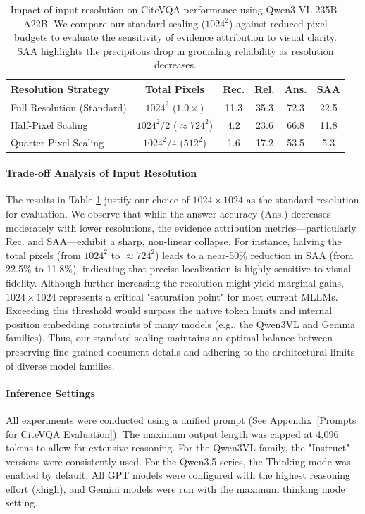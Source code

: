 \documentclass[]{opendatalab}
\begin{document}
{{{\begin{table}[htbp]
\centering
\small
\caption{Impact of input resolution on CiteVQA performance using Qwen3-VL-235B-A22B. We compare our standard scaling ($1024^2$) against reduced pixel budgets to evaluate the sensitivity of evidence attribution to visual clarity. SAA highlights the precipitous drop in grounding reliability as resolution decreases.}
\label{tab:resolution_impact}
\begin{tabular}{@{}l c cccc@{}}
\toprule
\textbf{Resolution Strategy} & \textbf{Total Pixels} & \textbf{Rec.} & \textbf{Rel.} & \textbf{Ans.} & \textbf{SAA} \\ \midrule
Full Resolution (Standard) & $1024^2$ ($1.0\times$) &11.3&35.3&72.3&22.5 \\
Half-Pixel Scaling & $1024^2 / 2$ ($\approx 724^2$) &4.2&23.6&66.8&11.8 \\
Quarter-Pixel Scaling & $1024^2 / 4$ ($512^2$) &1.6&17.2&53.5&5.3 \\ \bottomrule
\end{tabular}
\end{table}

\paragraph{Trade-off Analysis of Input Resolution}
The results in Table \ref{tab:resolution_impact} justify our choice of $1024 \times 1024$ as the standard resolution for evaluation. We observe that while the answer accuracy (Ans.) decreases moderately with lower resolutions, the evidence attribution metrics---particularly Rec. and SAA---exhibit a sharp, non-linear collapse. For instance, halving the total pixels (from $1024^2$ to $\approx 724^2$) leads to a near-50\% reduction in SAA (from 22.5\% to 11.8\%), indicating that precise localization is highly sensitive to visual fidelity. Although further increasing the resolution might yield marginal gains, $1024 \times 1024$ represents a critical "saturation point" for most current MLLMs. Exceeding this threshold would surpass the native token limits and internal position embedding constraints of many models (e.g., the Qwen3VL and Gemma families). Thus, our standard scaling maintains an optimal balance between preserving fine-grained document details and adhering to the architectural limits of diverse model families.

\paragraph{Inference Settings} All experiments were conducted using a unified prompt (See Appendix~\ref{Prompts for CiteVQA Evaluation}). The maximum output length was capped at 4,096 tokens to allow for extensive reasoning. For the Qwen3VL family, the "Instruct" versions were consistently used. For the Qwen3.5 series, the Thinking mode was enabled by default. All GPT models were configured with the highest reasoning effort (xhigh), and Gemini models were run with the maximum thinking mode setting.

}}}
\end{document}
